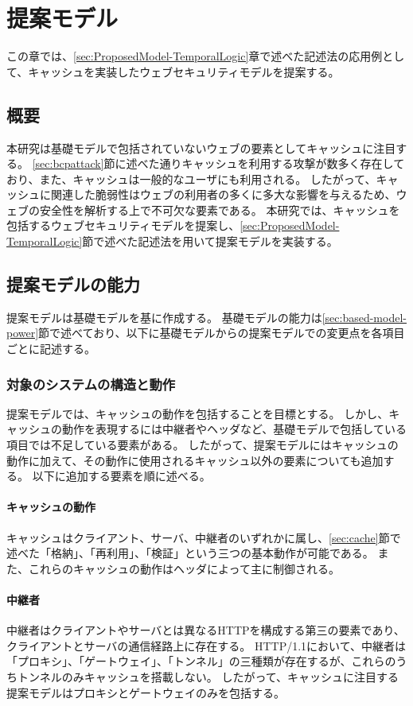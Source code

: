 \documentclass[12pt,a4paper]{jbook}
\begin{document}
\newpage

\color{red}
\chapter{提案モデル}
この章では、\ref{sec:ProposedModel-TemporalLogic}章で述べた記述法の応用例として、キャッシュを実装したウェブセキュリティモデルを提案する。

\section{概要}
本研究は基礎モデルで包括されていないウェブの要素としてキャッシュに注目する。
\ref{sec:bcpattack}節に述べた通りキャッシュを利用する攻撃が数多く存在しており、また、キャッシュは一般的なユーザにも利用される。
したがって、キャッシュに関連した脆弱性はウェブの利用者の多くに多大な影響を与えるため、ウェブの安全性を解析する上で不可欠な要素である。
本研究では、キャッシュを包括するウェブセキュリティモデルを提案し、\ref{sec:ProposedModel-TemporalLogic}節で述べた記述法を用いて提案モデルを実装する。

\section{提案モデルの能力}
\label{sec:ProposedModel-Power}
提案モデルは基礎モデルを基に作成する。
基礎モデルの能力は\ref{sec:based-model-power}節で述べており、以下に基礎モデルからの提案モデルでの変更点を各項目ごとに記述する。

\subsection{対象のシステムの構造と動作}
提案モデルでは、キャッシュの動作を包括することを目標とする。
しかし、キャッシュの動作を表現するには中継者やヘッダなど、基礎モデルで包括している項目では不足している要素がある。
したがって、提案モデルにはキャッシュの動作に加えて、その動作に使用されるキャッシュ以外の要素についても追加する。
以下に追加する要素を順に述べる。

\subsubsection{キャッシュの動作}
キャッシュはクライアント、サーバ、中継者のいずれかに属し、\ref{sec:cache}節で述べた「格納」、「再利用」、「検証」という三つの基本動作が可能である。
また、これらのキャッシュの動作はヘッダによって主に制御される。

\subsubsection{中継者}
中継者はクライアントやサーバとは異なるHTTPを構成する第三の要素であり、クライアントとサーバの通信経路上に存在する。
HTTP/1.1において、中継者は「プロキシ」、「ゲートウェイ」、「トンネル」の三種類が存在するが、これらのうちトンネルのみキャッシュを搭載しない。
したがって、キャッシュに注目する提案モデルはプロキシとゲートウェイのみを包括する。
\end{document}
